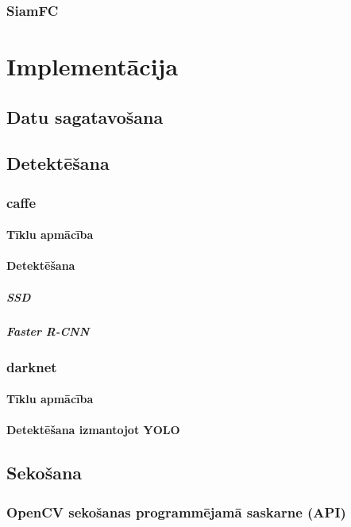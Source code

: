 \documentclass[12pt,paper=a4]{report}
\begin{document}
\subsection{SiamFC}
\chapter{Implementācija}
\section{Datu sagatavošana}
\section{Detektēšana}
\subsection{caffe}
\subsubsection{Tīklu apmācība}
\subsubsection{Detektēšana}
\paragraph{SSD}
\paragraph{Faster R-CNN}
\subsection{darknet}
\subsubsection{Tīklu apmācība}
\subsubsection{Detektēšana izmantojot YOLO}
\section{Sekošana}
\subsection{OpenCV sekošanas programmējamā saskarne (API)}
\end{document}
